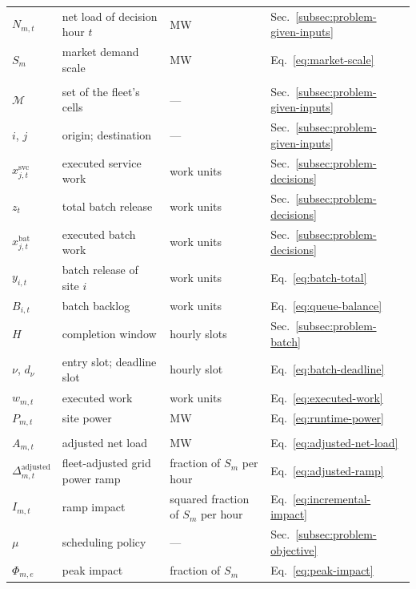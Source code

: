 \documentclass{UNCC-thesis}
\begin{document}
\begin{longtable}{@{}L{0.15\textwidth}L{0.37\textwidth}L{0.25\textwidth}L{0.13\textwidth}@{}}
  \(N_{m,t}\) & net load of decision hour \(t\) & MW & Sec.~\ref{subsec:problem-given-inputs} \\
  \(S_m\) & market demand scale & MW & Eq.~\eqref{eq:market-scale} \\
  \addlinespace
   \\
  \(\mathcal M\) & set of the fleet's cells & --- & Sec.~\ref{subsec:problem-given-inputs} \\
  \(i\), \(j\) & origin; destination & --- & Sec.~\ref{subsec:problem-given-inputs} \\
  \(x^{\mathrm{svc}}_{j,t}\) & executed service work & work units & Sec.~\ref{subsec:problem-decisions} \\
  \(z_t\) & total batch release & work units & Sec.~\ref{subsec:problem-decisions} \\
  \(x^{\mathrm{bat}}_{j,t}\) & executed batch work & work units & Sec.~\ref{subsec:problem-decisions} \\
  \(y_{i,t}\) & batch release of site \(i\) & work units & Eq.~\eqref{eq:batch-total} \\
  \(B_{i,t}\) & batch backlog & work units & Eq.~\eqref{eq:queue-balance} \\
  \(H\) & completion window & hourly slots & Sec.~\ref{subsec:problem-batch} \\
  \(\nu\), \(d_\nu\) & entry slot; deadline slot & hourly slot & Eq.~\eqref{eq:batch-deadline} \\
  \(w_{m,t}\) & executed work & work units & Eq.~\eqref{eq:executed-work} \\
  \(P_{m,t}\) & site power & MW & Eq.~\eqref{eq:runtime-power} \\
  \addlinespace
   \\
  \(A_{m,t}\) & adjusted net load & MW & Eq.~\eqref{eq:adjusted-net-load} \\
  \(\Delta^{\mathrm{adjusted}}_{m,t}\) & fleet-adjusted grid power ramp & fraction of \(S_m\) per hour & Eq.~\eqref{eq:adjusted-ramp} \\
  \(I_{m,t}\) & ramp impact & squared fraction of \(S_m\) per hour & Eq.~\eqref{eq:incremental-impact} \\
  \(\mu\) & scheduling policy & --- & Sec.~\ref{subsec:problem-objective} \\
  \(\Phi_{m,e}\) & peak impact & fraction of \(S_m\) & Eq.~\eqref{eq:peak-impact} \\

\end{longtable}
\end{document}
